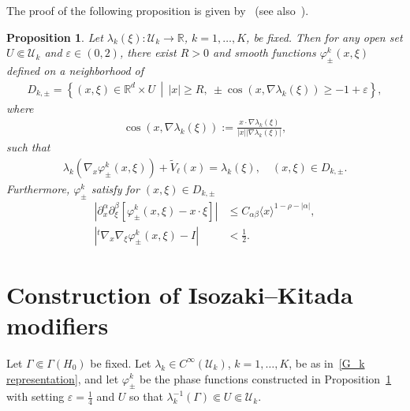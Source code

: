 \documentclass[10pt]{amsart}
\newtheorem{prop}[theo]{Proposition}
\theoremstyle{definition}
\numberwithin{equation}{section}
\newcommand{\e}{\varepsilon}
\newcommand{\f}{\varphi}
\renewcommand{\l}{\lambda}
\newcommand{\x}{\xi}
\newcommand{\R}{\mathbb{R}}
\newcommand{\US}{\mathcal{U}}
\begin{document}
The proof of the following proposition is given by~\cite[Section~2]{N3} (see also~\cite{IsoKita,T1}).

\begin{prop}\label{phase functions}
Let $\l_k(\x):\US_k\to\R$, $k=1,\dots,K$, be fixed. Then for any open set $U \Subset \US_k$ and $\e\in(0,2)$, there exist $R>0$ and smooth functions $\f_\pm^k(x,\x)$ defined on a neighborhood of
\begin{align*}
D_{k,\pm} = \left\{(x,\x)\in \R^d \times U \,\middle|\, |x| \geq R, \ \pm \cos(x,\nabla\lambda_k(\x)) \geq-1+\e \right\},
\end{align*}
where
\begin{align*}
\cos(x,\nabla\l_k(\x)) := \frac{x\cdot\nabla\l_k(\x)}{|x| |\nabla\l_k(\x)|},
\end{align*}
such that
\begin{align}\label{eikonal}
\l_k\left(\nabla_x\f_\pm^k(x,\x)\right) + \tilde V_\ell(x) = \l_k(\x), \quad (x,\x) \in D_{k,\pm}.
\end{align}
Furthermore, $\f_\pm^k$ satisfy for $(x,\xi)\in D_{k,\pm}$
\begin{align}
\left|\partial_x^\alpha\partial_\xi^\beta\left[\varphi_\pm^k(x,\xi)-x\cdot\xi\right]\right| &\leq C_{\alpha\beta} \langle x\rangle^{1-\rho-|\alpha|}, \label{phase estimate}
\\
\left|{}^t\nabla_x\nabla_\xi\varphi_\pm^k(x,\xi)-I \right|&<\frac{1}{2}. \label{phase estimate2}
\end{align}
\end{prop}
\section{Construction of Isozaki--Kitada modifiers}\label{IK section}

Let $\Gamma\Subset\Gamma(H_0)$ be fixed. Let $\l_k \in C^\infty(\US_k)$, $k=1,\dots,K$, be as in~\eqref{G_k representation}, and let $\f_{\pm}^{k}$ be the phase functions constructed in Proposition~\ref{phase functions} with setting $\e=\frac14$ and $U$ so that $\l_k^{-1}(\Gamma)\Subset U \Subset \US_k$.
\end{document}
